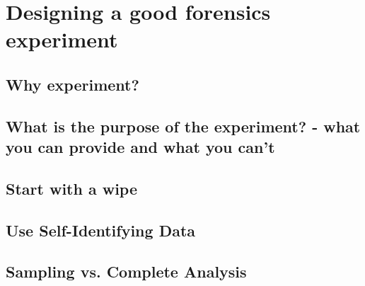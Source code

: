 \chapter{Designing a good forensics experiment}
\section{Why experiment?}
\section{What is the purpose of the experiment? - what you can provide and what you can't}
\section{Start with a wipe}
\section{Use Self-Identifying Data}

\section{Sampling vs. Complete Analysis}
